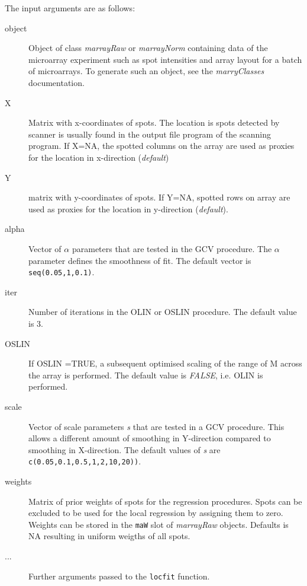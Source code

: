 \documentclass[a4paper,11pt]{article}
\begin{document}
\noindent The input arguments are  as follows:
           \begin{description}
           \item[object] Object of class \emph{marrayRaw} or \emph{marrayNorm} containing 
                         data of the microarray experiment such as spot intensities and array layout
                         for a batch of microarrays.
                         To generate such an object, see the \emph{marryClasses} documentation.
           \item[X]      Matrix with x-coordinates of spots. The location is spots detected by scanner
                         is usually 
                         found in the output file program of  the scanning program. 
                          If X=NA, the spotted columns on the  array are used as proxies for the location in x-direction (\emph{default})
           \item[Y] matrix with y-coordinates of spots. If Y=NA, spotted rows on array are used
            as proxies for the location in y-direction (\emph{default}).
           \item[alpha] Vector of $\alpha$  parameters that are tested in the GCV procedure. The $\alpha$  parameter 
                  defines the smoothness of fit.  The default vector is \texttt{seq(0.05,1,0.1)}.
           \item[iter] Number of iterations in the OLIN or OSLIN procedure. The default value is 3. 
           \item[OSLIN] If OSLIN =TRUE, a subsequent optimised scaling of the range of M across the array
                        is performed.
                         The default value is \emph{FALSE}, i.e. OLIN is performed. 
           \item[scale] Vector of scale parameters \emph{s} that are tested in a GCV procedure. 
                    This  allows  a different amount of smoothing in Y-direction compared 
                    to smoothing in X-direction. The default values of \emph{s} are 
                    \texttt{c(0.05,0.1,0.5,1,2,10,20))}.
           \item[weights] Matrix of prior weights of spots for the regression procedures.
                          Spots can be excluded to be used
                          for the local regression by assigning them to zero. Weights can be stored
                          in the \texttt{maW} slot of  \emph{marrayRaw} objects. Defaults is NA resulting
                          in uniform weigths of all spots. 
          \item[...] Further arguments passed to the  \texttt{locfit} function.	
      \end{description}
\end{document}
